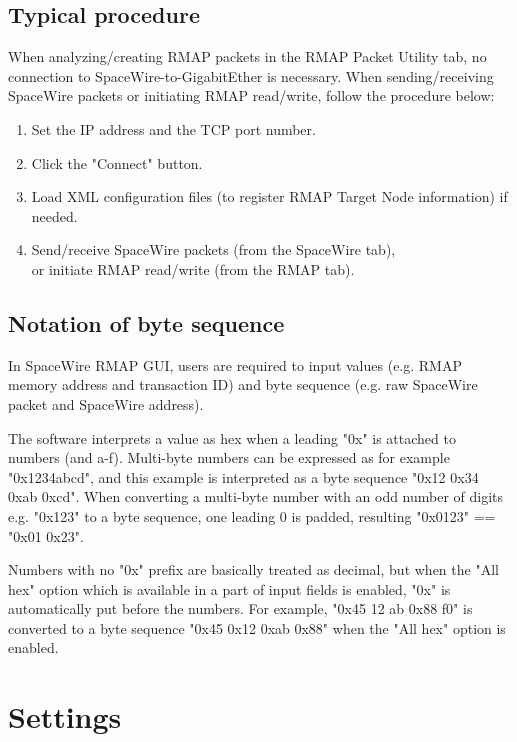 \documentclass[a4paper,10pt]{article}
\begin{document}
\subsection{Typical procedure}
When analyzing/creating RMAP packets in the RMAP Packet Utility tab, no connection to SpaceWire-to-GigabitEther is necessary.
When sending/receiving SpaceWire packets or initiating RMAP read/write, follow the procedure below:
\begin{enumerate}
  \setlength{\parskip}{0cm}
  \setlength{\itemsep}{0cm}
\item Set the IP address and the TCP port number.
\item Click the "Connect" button.
\item Load XML configuration files (to register RMAP Target Node information) if needed.
\item Send/receive SpaceWire packets (from the SpaceWire tab), \\
or initiate RMAP read/write (from the RMAP tab).\\
\end{enumerate}

\subsection{Notation of byte sequence}\label{section:numberNotation}
In SpaceWire RMAP GUI, users are required to input values (e.g. RMAP memory address and transaction ID) and 
byte sequence (e.g. raw SpaceWire packet and SpaceWire address).

The software interprets a value as hex when a leading "0x" is attached to numbers (and a-f).
Multi-byte numbers can be expressed as for example "0x1234abcd", and this example is interpreted as a byte sequence "0x12 0x34 0xab 0xcd".
When converting a multi-byte number with an odd number of digits e.g. "0x123" to a byte sequence, one leading 0 is padded, resulting "0x0123" == "0x01 0x23".

Numbers with no "0x" prefix are basically treated as decimal, but when the "All hex" option which is available in a part of input fields is enabled, "0x" is automatically put before the numbers. For example, "0x45 12 ab 0x88 f0" is converted to a byte sequence "0x45 0x12 0xab 0x88" when the "All hex" option is enabled.


\section{Settings}
\end{document}
